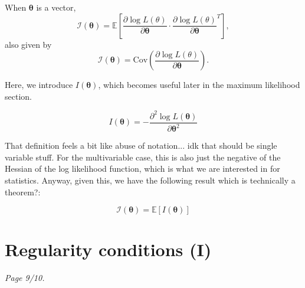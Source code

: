 \begin{definition}\label{defn:expected information - multi}
    When \(\bm{\theta}\) is a vector,  
    \begin{equation}\label{eq:expected info multi E score}
        \mathscr{I}(\bm{\theta}) = \mathbb{E}\left[\frac{\partial \log L(\theta)}{\partial \bm{\theta}} \cdot \frac{\partial \log L(\theta)}{\partial \bm{\theta}}^T\right],
    \end{equation}
    also given by 
    \begin{equation}\label{eq:expected info multi Cov score}
        \mathscr{I}(\bm{\theta}) = \text{Cov}\left(\frac{\partial \log L(\theta)}{\partial \bm{\theta}}\right).
    \end{equation}
\end{definition}

Here, we introduce \(I(\bm{\theta})\), which becomes useful later in the maximum likelihood section.

\begin{equation}\label{eq:I}
    I(\bm{\theta}) = -\frac{\partial^2 \log L(\bm{\theta})}{\partial \bm{\theta}^2}
\end{equation}

That definition feels a bit like abuse of notation... idk that should be single variable stuff. 
For the multivariable case, this is also just the negative of the Hessian of the log likelihood function, which is what we are interested in for statistics. 
Anyway, given this, we have the following result which is technically a theorem?:

\begin{equation}\label{eq:thm about expected info as the expectation of I}
    \mathscr{I}(\bm{\theta}) = \mathbb{E}[I(\bm{\theta})]
\end{equation}




\section{Regularity conditions (I)}\label{sec:reg conds I}

\textit{Page 9/10.}

